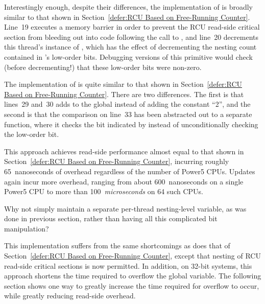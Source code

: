 Interestingly enough, despite their  differences,
the implementation of 
is broadly similar to that shown in
Section~\ref{defer:RCU Based on Free-Running Counter}.
Line~19 executes a memory barrier in order to prevent the RCU read-side
critical section from bleeding out into code following the call
to , and
line~20 decrements this thread's instance of ,
which has the effect of decrementing the nesting count contained in
's low-order bits.
Debugging versions of this primitive would check (before decrementing!)
that these low-order bits were non-zero.

The implementation of  is quite similar to
that shown in
Section~\ref{defer:RCU Based on Free-Running Counter}.
There are two differences.
The first is that lines~29 and~30 adds 
to the global  instead of adding the constant ``2'',
and the second is that the comparison on line~33 has been abstracted
out to a separate function, where it checks the bit indicated
by  instead of unconditionally checking
the low-order bit.

This approach achieves read-side performance almost equal to that
shown in
Section~\ref{defer:RCU Based on Free-Running Counter}, incurring
roughly 65~nanoseconds of overhead regardless of the number of
Power5 CPUs.
Updates again incur more overhead, ranging from about 600~nanoseconds on
a single Power5 CPU to more than 100~\emph{microseconds} on 64
such CPUs.

\QuickQuiz{}
	Why not simply maintain a separate per-thread nesting-level
	variable, as was done in previous section, rather than having
	all this complicated bit manipulation?
 \QuickQuizEnd

This implementation suffers from the same shortcomings as does that of
Section~\ref{defer:RCU Based on Free-Running Counter}, except that
nesting of RCU read-side critical sections is now permitted.
In addition, on 32-bit systems, this approach shortens the time
required to overflow the global  variable.
The following section shows one way to greatly increase the time
required for overflow to occur, while greatly reducing read-side
overhead.

